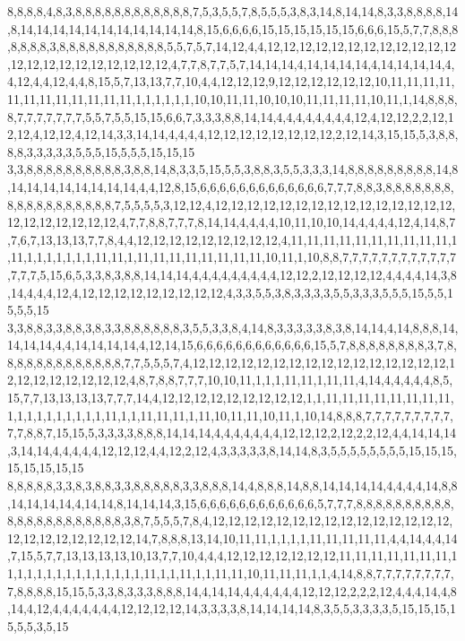 8,8,8,8,4,8,3,8,8,8,8,8,8,8,8,8,8,8,8,7,5,3,5,5,7,8,5,5,5,3,8,3,14,8,14,14,8,3,3,8,8,8,8,14,8,14,14,14,14,14,14,14,14,14,14,14,8,15,6,6,6,6,15,15,15,15,15,15,6,6,6,15,5,7,7,8,8,8,8,8,8,8,3,8,8,8,8,8,8,8,8,8,8,8,5,5,7,5,7,14,12,4,4,12,12,12,12,12,12,12,12,12,12,12,12,12,12,12,12,12,12,12,12,12,12,4,7,7,8,7,7,5,7,14,14,14,4,14,14,14,14,4,14,14,14,14,4,4,12,4,4,12,4,4,8,15,5,7,13,13,7,7,10,4,4,12,12,12,9,12,12,12,12,12,12,10,11,11,11,11,11,11,11,11,11,11,11,11,1,1,1,1,1,1,10,10,11,11,10,10,10,11,11,11,11,10,11,1,14,8,8,8,8,7,7,7,7,7,7,7,5,5,7,5,5,15,15,6,6,7,3,3,3,8,8,14,14,4,4,4,4,4,4,4,4,12,4,12,12,2,2,12,12,12,4,12,12,4,12,14,3,3,14,14,4,4,4,4,12,12,12,12,12,12,12,12,2,12,14,3,15,15,5,3,8,8,8,8,3,3,3,3,3,5,5,5,15,5,5,5,15,15,15
3,3,8,8,8,8,8,8,8,8,8,8,3,8,8,14,8,3,3,5,15,5,5,3,8,8,3,5,5,3,3,3,14,8,8,8,8,8,8,8,8,8,14,8,14,14,14,14,14,14,14,14,4,4,12,8,15,6,6,6,6,6,6,6,6,6,6,6,6,6,7,7,7,8,8,3,8,8,8,8,8,8,8,8,8,8,8,8,8,8,8,8,8,8,7,5,5,5,5,3,12,12,4,12,12,12,12,12,12,12,12,12,12,12,12,12,12,12,12,12,12,12,12,12,12,4,7,7,8,8,7,7,7,8,14,14,4,4,4,4,10,11,10,10,14,4,4,4,4,12,4,14,8,7,7,6,7,13,13,13,7,7,8,4,4,12,12,12,12,12,12,12,12,12,4,11,11,11,11,11,11,11,11,11,11,1,11,1,1,1,1,1,1,1,11,11,1,11,11,11,11,11,11,11,11,10,11,1,10,8,8,7,7,7,7,7,7,7,7,7,7,7,7,7,7,7,5,15,6,5,3,3,8,3,8,8,14,14,14,4,4,4,4,4,4,4,4,4,12,12,2,12,12,12,12,4,4,4,4,14,3,8,14,4,4,4,12,4,12,12,12,12,12,12,12,12,12,4,3,3,5,5,3,8,3,3,3,3,5,5,3,3,3,5,5,5,15,5,5,15,5,5,15
3,3,8,8,3,3,8,8,3,8,3,3,8,8,8,8,8,8,3,5,5,3,3,8,4,14,8,3,3,3,3,3,8,3,8,14,14,4,14,8,8,8,14,14,14,14,4,4,14,14,14,14,4,12,14,15,6,6,6,6,6,6,6,6,6,6,6,6,15,5,7,8,8,8,8,8,8,8,8,3,7,8,8,8,8,8,8,8,8,8,8,8,8,8,7,7,5,5,5,7,4,12,12,12,12,12,12,12,12,12,12,12,12,12,12,12,12,12,12,12,12,12,12,12,12,4,8,7,8,8,7,7,7,10,10,11,1,1,1,11,11,1,11,11,4,14,4,4,4,4,4,8,5,15,7,7,13,13,13,13,7,7,7,14,4,12,12,12,12,12,12,12,12,12,1,1,11,11,11,11,11,11,11,11,1,1,1,1,1,1,1,1,1,1,11,1,1,11,11,11,1,11,10,11,11,10,11,1,10,14,8,8,8,7,7,7,7,7,7,7,7,7,7,7,8,8,7,15,15,5,3,3,3,3,8,8,8,14,14,14,4,4,4,4,4,4,4,12,12,12,2,12,2,2,12,4,4,14,14,14,3,14,14,4,4,4,4,4,12,12,12,4,4,12,2,12,4,3,3,3,3,3,8,14,14,8,3,5,5,5,5,5,5,5,5,15,15,15,15,15,15,15,15
8,8,8,8,8,3,3,8,3,8,8,3,3,8,8,8,8,8,3,3,8,8,8,14,4,8,8,8,14,8,8,14,14,14,14,4,4,4,4,14,8,8,14,14,14,14,4,14,14,8,14,14,14,3,15,6,6,6,6,6,6,6,6,6,6,6,6,5,7,7,7,8,8,8,8,8,8,8,8,8,8,8,8,8,8,8,8,8,8,8,8,8,8,3,8,7,5,5,5,7,8,4,12,12,12,12,12,12,12,12,12,12,12,12,12,12,12,12,12,12,12,12,12,12,12,14,7,8,8,8,13,14,10,11,11,1,1,1,1,11,11,11,11,11,4,4,14,4,4,14,7,15,5,7,7,13,13,13,13,10,13,7,7,10,4,4,4,12,12,12,12,12,12,12,11,11,11,11,11,11,11,11,1,1,1,1,1,1,1,1,1,1,1,1,1,11,1,1,11,1,1,11,11,10,11,11,11,1,1,4,14,8,8,7,7,7,7,7,7,7,7,7,8,8,8,8,15,15,5,3,3,8,3,3,3,8,8,8,14,4,14,14,4,4,4,4,4,4,12,12,12,2,2,2,12,4,4,4,14,4,8,14,4,12,4,4,4,4,4,4,4,12,12,12,12,14,3,3,3,3,8,14,14,14,14,8,3,5,5,3,3,3,3,5,15,15,15,15,5,5,3,5,15
